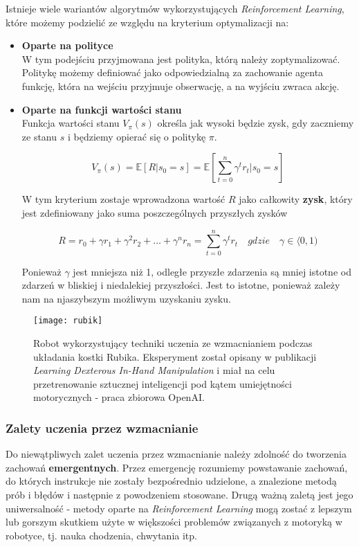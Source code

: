 \documentclass[12pt]{article}
\begin{document}
Istnieje wiele wariantów algorytmów wykorzystujących \emph{Reinforcement Learning}, które możemy podzielić ze względu na kryterium optymalizacji na:
\begin{itemize}
\item \textbf{Oparte na polityce} \\
W tym podejściu przyjmowana jest polityka, którą należy zoptymalizować. Politykę możemy definiować jako odpowiedzialną za zachowanie agenta funkcję, która na wejściu przyjmuje obserwację, a na wyjściu zwraca akcję.  

\item \textbf{Oparte na funkcji wartości stanu} \\
Funkcja wartości stanu $V_{\pi}(s)$ określa jak wysoki będzie zysk, gdy zaczniemy ze stanu $s$ i będziemy opierać się o politykę $\pi$. 

\[V_{\pi}(s) = \mathbb{E}[R | s_0=s] = \mathbb{E} \left[\sum_{t=0}^n \gamma^t r_t | s_0=s \right]\]

W tym kryterium zostaje wprowadzona wartość $R$ jako całkowity \textbf{zysk}, który jest zdefiniowany jako suma poszczególnych przyszłych zysków

\[R = r_{0} + \gamma r_1 + \gamma^2 r_2 + \ldots + \gamma^n r_n = \sum_{t=0}^n \gamma^t r_t \quad gdzie \quad \gamma \in \langle 0, 1)\]

Ponieważ $\gamma$ jest mniejsza niż 1, odległe przyszłe zdarzenia są mniej istotne od zdarzeń w bliskiej i niedalekiej przyszłości. Jest to istotne, ponieważ zależy nam na njaszybszym możliwym uzyskaniu zysku.
\end{itemize}

\begin{figure}[h]
\centering
\texttt{[image: rubik]}
\caption{Robot wykorzystujący techniki uczenia ze wzmacnianiem podczas układania kostki Rubika. Eksperyment został opisany w publikacji \emph{Learning Dexterous In-Hand Manipulation} i miał na celu przetrenowanie sztucznej inteligencji pod kątem umiejętności motorycznych - praca zbiorowa OpenAI.}
\end{figure}

\subsubsection{Zalety uczenia przez wzmacnianie}
Do niewątpliwych zalet uczenia przez wzmacnianie należy zdolność do tworzenia zachowań \textbf{emergentnych}. Przez emergencję rozumiemy powstawanie zachowań, do których instrukcje nie zostały bezpośrednio udzielone, a znalezione metodą prób i błędów i następnie z powodzeniem stosowane. Drugą ważną zaletą jest jego uniwersalność - metody oparte na \emph{Reinforcement Learning} mogą zostać z lepszym lub gorszym skutkiem użyte w większości problemów związanych z motoryką w robotyce, tj. nauka chodzenia, chwytania itp.
\end{document}
